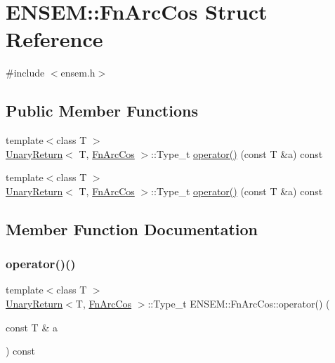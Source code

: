 \hypertarget{structENSEM_1_1FnArcCos}{}\section{E\+N\+S\+EM\+:\+:Fn\+Arc\+Cos Struct Reference}
\label{structENSEM_1_1FnArcCos}


{\ttfamily \#include $<$ensem.\+h$>$}

\subsection*{Public Member Functions}
\begin{DoxyCompactItemize}
\item 
{\footnotesize template$<$class T $>$ }\\\mbox{\hyperlink{structENSEM_1_1UnaryReturn}{Unary\+Return}}$<$ T, \mbox{\hyperlink{structENSEM_1_1FnArcCos}{Fn\+Arc\+Cos}} $>$\+::Type\+\_\+t \mbox{\hyperlink{structENSEM_1_1FnArcCos_a7d507fc5962b17eedfa81873113d0b96}{operator()}} (const T \&a) const
\item 
{\footnotesize template$<$class T $>$ }\\\mbox{\hyperlink{structENSEM_1_1UnaryReturn}{Unary\+Return}}$<$ T, \mbox{\hyperlink{structENSEM_1_1FnArcCos}{Fn\+Arc\+Cos}} $>$\+::Type\+\_\+t \mbox{\hyperlink{structENSEM_1_1FnArcCos_a7d507fc5962b17eedfa81873113d0b96}{operator()}} (const T \&a) const
\end{DoxyCompactItemize}


\subsection{Member Function Documentation}
\mbox{\label{structENSEM_1_1FnArcCos_a7d507fc5962b17eedfa81873113d0b96}} 
\subsubsection{\texorpdfstring{operator()()}{operator()()}\hspace{0.1cm}{\footnotesize\ttfamily [1/2]}}
{\footnotesize\ttfamily template$<$class T $>$ \\
\mbox{\hyperlink{structENSEM_1_1UnaryReturn}{Unary\+Return}}$<$T, \mbox{\hyperlink{structENSEM_1_1FnArcCos}{Fn\+Arc\+Cos}} $>$\+::Type\+\_\+t E\+N\+S\+E\+M\+::\+Fn\+Arc\+Cos\+::operator() (\begin{DoxyParamCaption}\item[{const T \&}]{a }\end{DoxyParamCaption}) const\hspace{0.3cm}{\ttfamily [inline]}}

